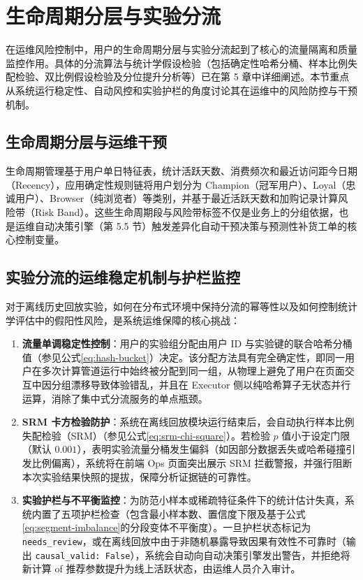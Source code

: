 \section{生命周期分层与实验分流}

在运维风险控制中，用户的生命周期分层与实验分流起到了核心的流量隔离和质量监控作用。具体的分流算法与统计学假设检验（包括确定性哈希分桶、样本比例失配检验、双比例假设检验及分位提升分析等）已在第 5 章中详细阐述。本节重点从系统运行稳定性、自动风控和实验护栏的角度讨论其在运维中的风险防控与干预机制。

\subsection{生命周期分层与运维干预}

生命周期管理基于用户单日特征表，统计活跃天数、消费频次和最近访问距今日期（Recency），应用确定性规则链将用户划分为 Champion（冠军用户）、Loyal（忠诚用户）、Browser（纯浏览者）等类别，并基于最近活跃天数和加购记录计算风险带（Risk Band）。这些生命周期段与风险带标签不仅是业务上的分组依据，也是运维自动决策引擎（第 5.5 节）触发差异化自动干预决策与预测性补货工单的核心控制变量。

\subsection{实验分流的运维稳定机制与护栏监控}

对于离线历史回放实验，如何在分布式环境中保持分流的幂等性以及如何控制统计学评估中的假阳性风险，是系统运维保障的核心挑战：
\begin{enumerate}
    \item \textbf{流量单调稳定性控制}：用户的实验组分配由用户 ID 与实验键的联合哈希分桶值（参见公式\eqref{eq:hash-bucket}）决定。该分配方法具有完全确定性，即同一用户在多次计算管道运行中始终被分配到同一组，从物理上避免了用户在页面交互中因分组漂移导致体验错乱，并且在 Executor 侧以纯哈希算子无状态并行运算，消除了集中式分流服务的单点瓶颈。
    \item \textbf{SRM 卡方检验防护}：系统在离线回放模块运行结束后，会自动执行样本比例失配检验（SRM）（参见公式\eqref{eq:srm-chi-square}）。若检验 $p$ 值小于设定门限（默认 $0.001$），表明实验流量分桶发生偏斜（如因部分数据丢失或哈希碰撞引发比例偏离），系统将在前端 Ops 页面突出展示 SRM 拦截警报，并强行阻断本次实验结果快照的提拔，保障分析证据链的可靠性。
    \item \textbf{实验护栏与不平衡监控}：为防范小样本或稀疏特征条件下的统计估计失真，系统内置了五项护栏检查（包含最小样本数、置信度下限及基于公式\eqref{eq:segment-imbalance}的分段变体不平衡度）。一旦护栏状态标记为 \texttt{needs\_review}，或在离线回放中由于非随机暴露导致因果有效性不可靠时（输出 \texttt{causal\_valid: False}），系统会自动向自动决策引擎发出警告，并拒绝将新计算 of 推荐参数提升为线上活跃状态，由运维人员介入审计。
\end{enumerate}

